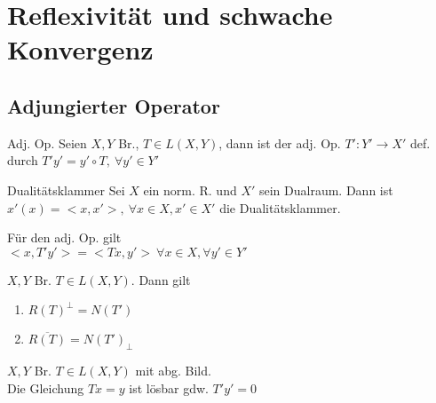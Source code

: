 \section{Reflexivität und schwache Konvergenz}

\subsection{Adjungierter Operator}

\begin{definition}{Adj. Op.}
    Seien \(X,Y\) Br., \(T\in L(X,Y)\), dann ist der adj. Op. \(T':Y'\to X'\)
    def. durch \(T'y' = y' \circ T,\ \forall y'\in Y'\)
\end{definition}

\begin{definition}{Dualitätsklammer}
    Sei \(X\) ein norm. R. und \(X'\) sein Dualraum.
    Dann ist \(x'(x) = <x,x'>,\ \forall x\in X, x'\in X'\)
    die Dualitätsklammer.
\end{definition}

\begin{bemerkung}
    Für den adj. Op. gilt\\
    \(<x,T'y'> = <Tx,y'>\ 
    \forall x\in X,\forall y'\in Y'\)
\end{bemerkung}

\begin{satz}
    \(X,Y\) Br. \(T\in L(X,Y)\). Dann gilt
    \begin{enumerate}[label = (\roman*)]
        \item \(R(T)^\perp = N(T')\)
        \item \(\overline{R(T)} = N(T')_\perp\)
    \end{enumerate}
\end{satz}

\begin{korrolar}
    \(X,Y\) Br. \(T\in L(X,Y)\) mit abg. Bild.\\
    Die Gleichung \(Tx=y\) ist lösbar gdw. \(T'y' = 0\)
\end{korrolar}

